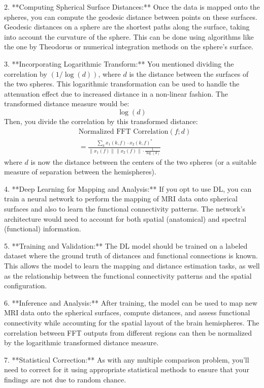 \documentclass[twocolumn]{article}
\begin{document}
2. **Computing Spherical Surface Distances:**
Once the data is mapped onto the spheres, you can compute the geodesic distance between points on these surfaces. Geodesic distances on a sphere are the shortest paths along the surface, taking into account the curvature of the sphere. This can be done using algorithms like the one by Theodorus or numerical integration methods on the sphere's surface.

3. **Incorporating Logarithmic Transform:**
You mentioned dividing the correlation by $( 1/\log(d) )$, where $d$ is the distance between the surfaces
of the two spheres. This logarithmic transformation can be used to handle the attenuation effect due to increased distance in a non-linear fashion. The transformed distance measure would be:
\[ \log(d) \]
Then, you divide the correlation by this transformed distance:
\begin{align}
&\text{Normalized FFT Correlation}(f; d)\\
&= \frac{\sum_{k} x_1(k, f) \cdot x_2(k, f)^*}{\|x_1(f)\| \|x_2(f)\|
\cdot \frac{1}{\log(d)}} 
\end{align}
where $d$ is now the distance between the centers of the two spheres (or a suitable measure of
separation between the hemispheres).

4. **Deep Learning for Mapping and Analysis:**
If you opt to use DL, you can train a neural network to perform the mapping of MRI data onto spherical
surfaces and also to learn the functional connectivity patterns. The network's architecture would need to account for both spatial (anatomical) and spectral (functional) information.

5. **Training and Validation:**
The DL model should be trained on a labeled dataset where the ground truth of distances and functional
connections is known. This allows the model to learn the mapping and distance estimation tasks, as well as the relationship between the functional connectivity patterns and the spatial configuration.

6. **Inference and Analysis:**
After training, the model can be used to map new MRI data onto the spherical surfaces, compute
distances, and assess functional connectivity while accounting for the spatial layout of the brain hemispheres. The correlation between FFT outputs from different regions can then be normalized by the logarithmic transformed distance measure.

7. **Statistical Correction:**
As with any multiple comparison problem, you'll need to correct for it using appropriate statistical
methods to ensure that your findings are not due to random chance.
\end{document}
